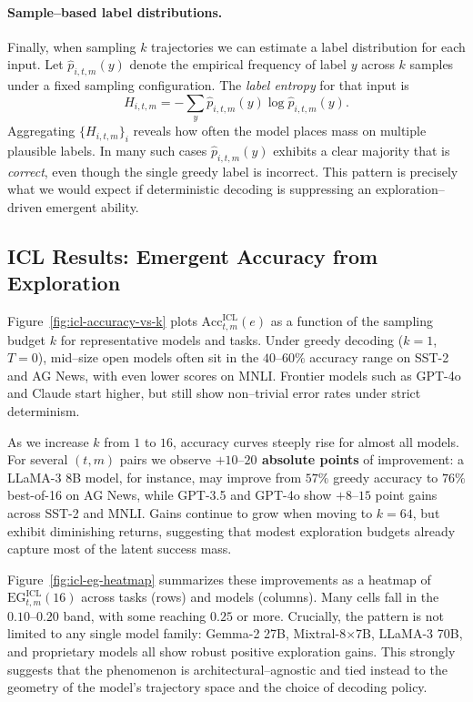 \paragraph{Sample--based label distributions.}
Finally, when sampling $k$ trajectories we can estimate a label distribution
for each input. Let $\hat{p}_{i,t,m}(y)$ denote the empirical frequency of
label $y$ across $k$ samples under a fixed sampling configuration. The
\emph{label entropy} for that input is
\[
H_{i,t,m}
= - \sum_{y} \hat{p}_{i,t,m}(y)
    \log \hat{p}_{i,t,m}(y).
\]
Aggregating $\{H_{i,t,m}\}_i$ reveals how often the model places mass on
multiple plausible labels. In many such cases $\hat{p}_{i,t,m}(y)$ exhibits a
clear majority that is \emph{correct}, even though the single greedy label is
incorrect. This pattern is precisely what we would expect if deterministic
decoding is suppressing an exploration--driven emergent ability.

\subsection{ICL Results: Emergent Accuracy from Exploration}

Figure~\ref{fig:icl-accuracy-vs-k} plots $\mathrm{Acc}^{\text{ICL}}_{t,m}(e)$
as a function of the sampling budget $k$ for representative models and tasks.
Under greedy decoding ($k{=}1$, $T{=}0$), mid--size open models often sit in the
$40\text{--}60\%$ accuracy range on SST-2 and AG News, with even lower scores
on MNLI. Frontier models such as GPT-4o and Claude start higher, but still
show non--trivial error rates under strict determinism.

As we increase $k$ from $1$ to $16$, accuracy curves steeply rise for almost
all models. For several $(t,m)$ pairs we observe
\textbf{$+10\text{--}20$ absolute points} of improvement:
a LLaMA-3 8B model, for instance, may improve from $57\%$ greedy accuracy to
$76\%$ best-of-16 on AG News, while GPT-3.5 and GPT-4o show
$+8\text{--}15$ point gains across SST-2 and MNLI. Gains continue to grow when
moving to $k{=}64$, but exhibit diminishing returns, suggesting that modest
exploration budgets already capture most of the latent success mass.

Figure~\ref{fig:icl-eg-heatmap} summarizes these improvements as a heatmap of
$\mathrm{EG}^{\text{ICL}}_{t,m}(16)$ across tasks (rows) and models (columns).
Many cells fall in the $\mathbf{0.10\text{--}0.20}$ band, with some reaching
$\mathbf{0.25}$ or more. Crucially, the pattern is not limited to any single
model family: Gemma-2 27B, Mixtral-8$\times$7B, LLaMA-3 70B, and proprietary
models all show robust positive exploration gains. This strongly suggests that
the phenomenon is architectural--agnostic and tied instead to the geometry of
the model's trajectory space and the choice of decoding policy.

